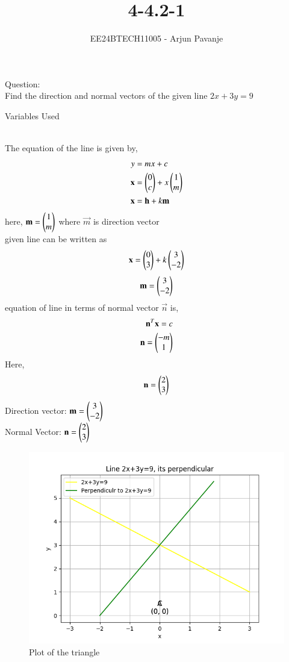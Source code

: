\documentclass[journal]{IEEEtran}
\begin{document}

\vspace{3cm}

\title{4-4.2-1}
\author{EE24BTECH11005 - Arjun Pavanje}
{\let\newpage\relax\maketitle}
Question:\\
Find the direction and normal vectors of the given line $2x+3y=9$
\begin{table}[h!]    
  \centering
  
  \caption{Variables Used}
  \label{tab1-1.9-6}
\end{table}\\
\solution
The equation of the line is given by,
\begin{align}
	y&=mx+c\\
	\mathbf{x}&=\begin{pmatrix}0\\c\end{pmatrix}+ x \begin{pmatrix}1\\m\end{pmatrix}\\
	\mathbf{x}&=\mathbf{h}+k\mathbf{m}
\end{align}
here, $\mathbf{m}=\begin{pmatrix}1\\m\end{pmatrix}$ where $\vec{m}$ is direction vector\\
given line can be written as\\
$$\mathbf{x}=\begin{pmatrix}0\\3\end{pmatrix}+k\begin{pmatrix}3\\-2\end{pmatrix}$$
$$\mathbf{m}=\begin{pmatrix}3\\-2\end{pmatrix}$$
equation of line in terms of normal vector $\vec{n}$ is,
\begin{align}
\mathbf{n}^T\mathbf{x}=c\\
	\mathbf{n}=\begin{pmatrix}-m\\1\end{pmatrix}
\end{align}
Here, $$\mathbf{n}=\begin{pmatrix}2\\3\end{pmatrix}$$
Direction vector: $\mathbf{m}=\begin{pmatrix}3\\-2\end{pmatrix}$\\
Normal Vector: $\mathbf{n}=\begin{pmatrix}2\\3\end{pmatrix}$
\begin{figure}[h!]
   \centering
   \includegraphics[width = 1\linewidth]{figs/fig.png}
   \caption{Plot of the triangle}
   \label{stemplot}
\end{figure}
\end{document}
